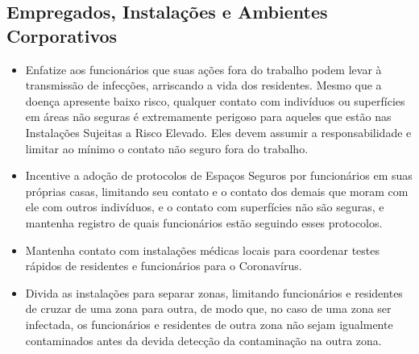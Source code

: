 \documentclass[onecolumn,journal]{IEEEtran}
\begin{document}
\begin{multicols}{2}
\section*{Empregados, Instalações e Ambientes Corporativos}
\begin{itemize}
\item Enfatize aos funcionários que suas ações fora do trabalho podem levar à transmissão de infecções, arriscando a vida dos residentes. Mesmo que a doença apresente baixo risco, qualquer contato com indivíduos ou superfícies em áreas não seguras é extremamente perigoso para aqueles que estão nas Instalações Sujeitas a Risco Elevado. Eles devem assumir a responsabilidade e limitar ao mínimo o contato não seguro fora do trabalho.
\item Incentive a adoção de protocolos de Espaços Seguros por funcionários em suas próprias casas, limitando seu contato e o contato dos demais que moram com ele com outros indivíduos, e o contato com superfícies não são seguras, e mantenha registro de quais funcionários estão seguindo esses protocolos.
\item Mantenha contato com instalações médicas locais para coordenar testes rápidos de residentes e funcionários para o Coronavírus.
\item Divida as instalações para separar zonas, limitando funcionários e residentes de cruzar de uma zona para outra, de modo que, no caso de uma zona ser infectada, os funcionários e residentes de outra zona não sejam igualmente contaminados antes da devida detecção da contaminação na outra zona.
\end{itemize}




\end{multicols}

\vspace{2ex}

% 

\end{document}
